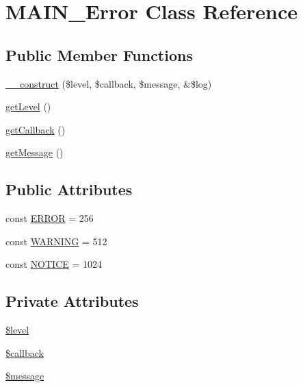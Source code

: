\hypertarget{classMAIN__Error}{
\section{MAIN\_\-Error Class Reference}
\label{d4/d5e/classMAIN__Error}
}
\subsection*{Public Member Functions}
\begin{DoxyCompactItemize}
\item 
\hyperlink{classMAIN__Error_a9cc959e84c15f51a4a843cbe43f24dfc}{\_\-\_\-construct} (\$level, \$callback, \$message, \&\$log)
\item 
\hyperlink{classMAIN__Error_a8bc58c66c7de8909650c8da9c13cf49d}{getLevel} ()
\item 
\hyperlink{classMAIN__Error_a1c55316aa04e3a3b938466aa65579849}{getCallback} ()
\item 
\hyperlink{classMAIN__Error_a9ba9f938e081a5f3cc077f2ff1d29962}{getMessage} ()
\end{DoxyCompactItemize}
\subsection*{Public Attributes}
\begin{DoxyCompactItemize}
\item 
const \hyperlink{classMAIN__Error_a8dd94ca1db9a48b21bad30ed114e7fbe}{ERROR} = 256
\item 
const \hyperlink{classMAIN__Error_af47cc28f788d73c277a78761621fd711}{WARNING} = 512
\item 
const \hyperlink{classMAIN__Error_a6566891abdf29792892d9cf42fcc496d}{NOTICE} = 1024
\end{DoxyCompactItemize}
\subsection*{Private Attributes}
\begin{DoxyCompactItemize}
\item 
\hyperlink{classMAIN__Error_acddcbb7c1ce7ac137b542542282ec4bc}{\$level}
\item 
\hyperlink{classMAIN__Error_a3febaeaa4f0bfe2df03c8ce837b22acb}{\$callback}
\item 
\hyperlink{classMAIN__Error_a7210e16c421fd1a44fa947273bff58b5}{\$message}
\end{DoxyCompactItemize}


